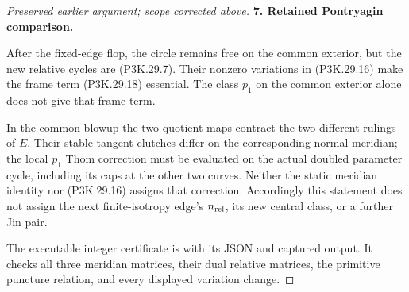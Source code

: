 \begin{proof}[Preserved earlier argument; scope corrected above]
\par\medskip\noindent\textbf{7. Retained Pontryagin comparison.}\enspace

After the fixed-edge flop, the circle remains free on the
common exterior, but the new relative cycles are
(P3K.29.7). Their nonzero variations in
(P3K.29.16) make the frame term (P3K.29.18) essential.
The class \(p_1\) on the common exterior alone does not
give that frame term.

In the common blowup the two quotient maps contract the
two different rulings of \(E\). Their stable tangent
clutches differ on the corresponding normal meridian;
the local \(p_1\) Thom correction must be evaluated on
the actual doubled parameter cycle, including its
caps at the other two curves. Neither the static
meridian identity nor (P3K.29.16) assigns that correction.
Accordingly this statement does not assign the next
finite-isotropy edge's \(n_{\rm rel}\), its new central
class, or a further Jin pair.

The executable integer certificate is
 with its
JSON and captured output. It checks all three meridian
matrices, their dual relative matrices, the primitive
puncture relation, and every displayed variation change.
\end{proof}
